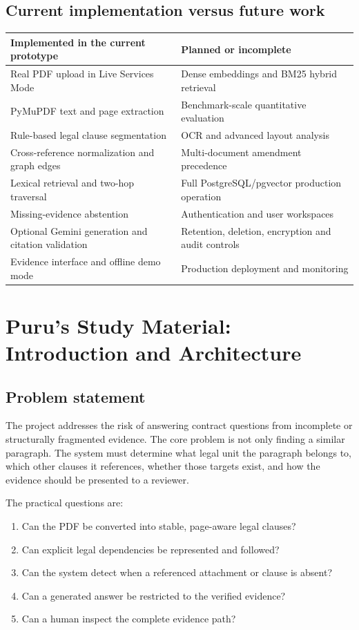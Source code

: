 \documentclass[11pt,letterpaper]{article}
\begin{document}
\subsection{Current implementation versus future work}
\begin{tabularx}{\textwidth}{X X}
\toprule
\textbf{Implemented in the current prototype} & \textbf{Planned or incomplete}\\
\midrule
Real PDF upload in Live Services Mode & Dense embeddings and BM25 hybrid retrieval\\
PyMuPDF text and page extraction & Benchmark-scale quantitative evaluation\\
Rule-based legal clause segmentation & OCR and advanced layout analysis\\
Cross-reference normalization and graph edges & Multi-document amendment precedence\\
Lexical retrieval and two-hop traversal & Full PostgreSQL/pgvector production operation\\
Missing-evidence abstention & Authentication and user workspaces\\
Optional Gemini generation and citation validation & Retention, deletion, encryption and audit controls\\
Evidence interface and offline demo mode & Production deployment and monitoring\\
\bottomrule
\end{tabularx}

\newpage
\section{Puru's Study Material: Introduction and Architecture}
\subsection{Problem statement}
The project addresses the risk of answering contract questions from incomplete or structurally fragmented evidence. The core problem is not only finding a similar paragraph. The system must determine what legal unit the paragraph belongs to, which other clauses it references, whether those targets exist, and how the evidence should be presented to a reviewer.

The practical questions are:
\begin{enumerate}
  \item Can the PDF be converted into stable, page-aware legal clauses?
  \item Can explicit legal dependencies be represented and followed?
  \item Can the system detect when a referenced attachment or clause is absent?
  \item Can a generated answer be restricted to the verified evidence?
  \item Can a human inspect the complete evidence path?
\end{enumerate}
\end{document}
